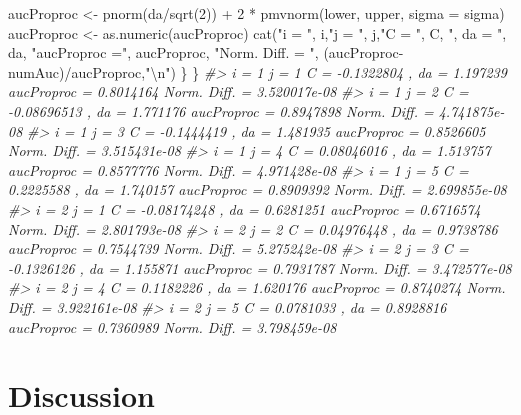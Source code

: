 \documentclass[
]{book}
\newenvironment{Shaded}{\begin{snugshade}}{\end{snugshade}}
\newcommand{\AttributeTok}[1]{\textcolor[rgb]{0.77,0.63,0.00}{#1}}
\newcommand{\CommentTok}[1]{\textcolor[rgb]{0.56,0.35,0.01}{\textit{#1}}}
\newcommand{\DecValTok}[1]{\textcolor[rgb]{0.00,0.00,0.81}{#1}}
\newcommand{\FunctionTok}[1]{\textcolor[rgb]{0.00,0.00,0.00}{#1}}
\newcommand{\NormalTok}[1]{#1}
\newcommand{\OtherTok}[1]{\textcolor[rgb]{0.56,0.35,0.01}{#1}}
\newcommand{\SpecialCharTok}[1]{\textcolor[rgb]{0.00,0.00,0.00}{#1}}
\newcommand{\StringTok}[1]{\textcolor[rgb]{0.31,0.60,0.02}{#1}}
\begin{document}
\begin{Shaded}
\begin{Highlighting}[]
\NormalTok{    aucProproc }\OtherTok{\textless{}{-}} \FunctionTok{pnorm}\NormalTok{(da}\SpecialCharTok{/}\FunctionTok{sqrt}\NormalTok{(}\DecValTok{2}\NormalTok{)) }\SpecialCharTok{+} \DecValTok{2} \SpecialCharTok{*} \FunctionTok{pmvnorm}\NormalTok{(lower, upper, }\AttributeTok{sigma =}\NormalTok{ sigma)}
\NormalTok{    aucProproc }\OtherTok{\textless{}{-}}  \FunctionTok{as.numeric}\NormalTok{(aucProproc)}
    \FunctionTok{cat}\NormalTok{(}\StringTok{"i = "}\NormalTok{, i,}\StringTok{"j = "}\NormalTok{, j,}\StringTok{"C = "}\NormalTok{, C, }\StringTok{", da = "}\NormalTok{, da, }\StringTok{"aucProproc ="}\NormalTok{, aucProproc, }\StringTok{"Norm. Diff. = "}\NormalTok{, (aucProproc}\SpecialCharTok{{-}}\NormalTok{numAuc)}\SpecialCharTok{/}\NormalTok{aucProproc,}\StringTok{"}\SpecialCharTok{\textbackslash{}n}\StringTok{"}\NormalTok{)}
\NormalTok{  \}}
\NormalTok{\}}
\CommentTok{\#\textgreater{} i =  1 j =  1 C =  {-}0.1322804 , da =  1.197239 aucProproc = 0.8014164 Norm. Diff. =  3.520017e{-}08 }
\CommentTok{\#\textgreater{} i =  1 j =  2 C =  {-}0.08696513 , da =  1.771176 aucProproc = 0.8947898 Norm. Diff. =  4.741875e{-}08 }
\CommentTok{\#\textgreater{} i =  1 j =  3 C =  {-}0.1444419 , da =  1.481935 aucProproc = 0.8526605 Norm. Diff. =  3.515431e{-}08 }
\CommentTok{\#\textgreater{} i =  1 j =  4 C =  0.08046016 , da =  1.513757 aucProproc = 0.8577776 Norm. Diff. =  4.971428e{-}08 }
\CommentTok{\#\textgreater{} i =  1 j =  5 C =  0.2225588 , da =  1.740157 aucProproc = 0.8909392 Norm. Diff. =  2.699855e{-}08 }
\CommentTok{\#\textgreater{} i =  2 j =  1 C =  {-}0.08174248 , da =  0.6281251 aucProproc = 0.6716574 Norm. Diff. =  2.801793e{-}08 }
\CommentTok{\#\textgreater{} i =  2 j =  2 C =  0.04976448 , da =  0.9738786 aucProproc = 0.7544739 Norm. Diff. =  5.275242e{-}08 }
\CommentTok{\#\textgreater{} i =  2 j =  3 C =  {-}0.1326126 , da =  1.155871 aucProproc = 0.7931787 Norm. Diff. =  3.472577e{-}08 }
\CommentTok{\#\textgreater{} i =  2 j =  4 C =  0.1182226 , da =  1.620176 aucProproc = 0.8740274 Norm. Diff. =  3.922161e{-}08 }
\CommentTok{\#\textgreater{} i =  2 j =  5 C =  0.0781033 , da =  0.8928816 aucProproc = 0.7360989 Norm. Diff. =  3.798459e{-}08}
\end{Highlighting}
\end{Shaded}

\hypertarget{discussion-1}{%
\section{Discussion}\label{discussion-1}}
\end{document}
